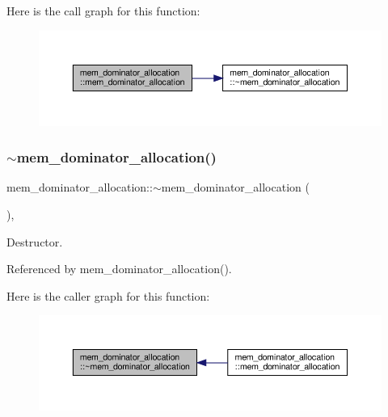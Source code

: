 Here is the call graph for this function\+:
\nopagebreak
\begin{figure}[H]
\begin{center}
\leavevmode
\includegraphics[width=350pt]{da/d83/classmem__dominator__allocation_ab513e5b2281e3ae087e6721df28bd3b9_cgraph}
\end{center}
\end{figure}
\mbox{\label{classmem__dominator__allocation_a4c2e1b1e8967803c23a7797edc71173c}} 
\subsubsection{\texorpdfstring{$\sim$mem\+\_\+dominator\+\_\+allocation()}{~mem\_dominator\_allocation()}}
{\footnotesize\ttfamily mem\+\_\+dominator\+\_\+allocation\+::$\sim$mem\+\_\+dominator\+\_\+allocation (\begin{DoxyParamCaption}{ }\end{DoxyParamCaption})\hspace{0.3cm}{\ttfamily [override]}, {\ttfamily [default]}}



Destructor. 



Referenced by mem\+\_\+dominator\+\_\+allocation().

Here is the caller graph for this function\+:
\nopagebreak
\begin{figure}[H]
\begin{center}
\leavevmode
\includegraphics[width=350pt]{da/d83/classmem__dominator__allocation_a4c2e1b1e8967803c23a7797edc71173c_icgraph}
\end{center}
\end{figure}


